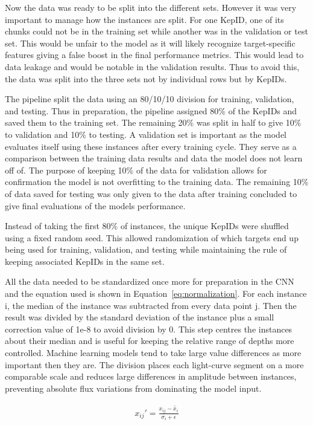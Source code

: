 Now the data was ready to be split into the different sets. However it was very important to manage how the instances are split. For one KepID, one of its chunks could not be in the training set while another was in the validation or test set. This would be unfair to the model as it will likely recognize target-specific features giving a false boost in the final performance metrics. This would lead to data leakage and would be notable in the validation results. Thus to avoid this, the data was split into the three sets not by individual rows but by KepIDs.

The pipeline split the data using an 80/10/10 division for training, validation, and testing. Thus in preparation, the pipeline assigned 80\% of the KepIDs and saved them to the training set. The remaining 20\% was split in half to give 10\% to validation and 10\% to testing. A validation set is important as the model evaluates itself using these instances after every training cycle. They serve as a comparison between the training data results and data the model does not learn off of. The purpose of keeping 10\% of the data for validation allows for confirmation the model is not overfitting to the training data. The remaining 10\% of data saved for testing was only given to the data after training concluded to give final evaluations of the models performance.

Instead of taking the first 80\% of instances, the unique KepIDs were shuffled using a fixed random seed. This allowed randomization of which targets end up being used for training, validation, and testing while maintaining the rule of keeping associated KepIDs in the same set. 

All the data needed to be standardized once more for preparation in the CNN and the equation used is shown in Equation~\ref{eq:normalization}. For each instance i, the median of the instance was subtracted from every data point j. Then the result was divided by the standard deviation of the instance plus a small correction value of 1e-8 to avoid division by 0. This step centres the instances about their median and is useful for keeping the relative range of depths more controlled. Machine learning models tend to take large value differences as more important then they are. The division places each light-curve segment on a more comparable scale and reduces large differences in amplitude between instances, preventing absolute flux variations from dominating the model input.

\begin{align}
    x_{ij}' = \frac{x_{ij}-\tilde{x_i}}{\sigma_i+\epsilon} \label{eq:normalization}
\end{align}

